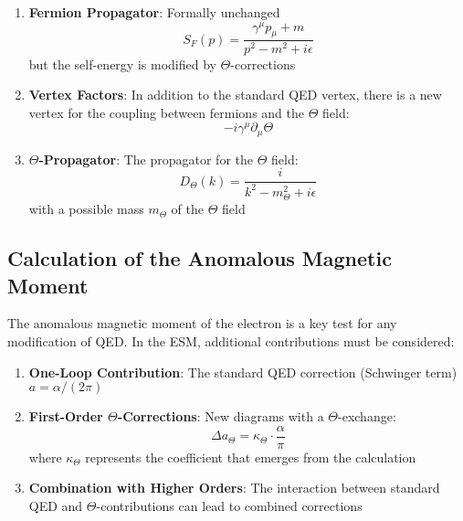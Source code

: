 \documentclass[12pt,a4paper]{article}
\begin{document}
	\begin{enumerate}
		\item \textbf{Fermion Propagator}: Formally unchanged
		\begin{equation}
			S_F(p) = \frac{\gamma^{\mu}p_{\mu} + m}{p^2 - m^2 + i\epsilon}
			\label{eq:fermion_propagator}
		\end{equation}
		but the self-energy is modified by $\Theta$-corrections
		
		\item \textbf{Vertex Factors}: In addition to the standard QED vertex, there is a new vertex for the coupling between fermions and the $\Theta$ field:
		\begin{equation}
			-i\gamma^{\mu}\partial_{\mu}\Theta
			\label{eq:theta_vertex}
		\end{equation}
		
		\item \textbf{$\Theta$-Propagator}: The propagator for the $\Theta$ field:
		\begin{equation}
			D_{\Theta}(k) = \frac{i}{k^2 - m_{\Theta}^2 + i\epsilon}
			\label{eq:theta_propagator}
		\end{equation}
		with a possible mass $m_{\Theta}$ of the $\Theta$ field
	\end{enumerate}
	
	\subsection{Calculation of the Anomalous Magnetic Moment}
	\label{subsec:magnetic_moment}
	
	The anomalous magnetic moment of the electron is a key test for any modification of QED. In the ESM, additional contributions must be considered:
	
	\begin{enumerate}
		\item \textbf{One-Loop Contribution}: The standard QED correction (Schwinger term) $a = \alpha/(2\pi)$
		\item \textbf{First-Order $\Theta$-Corrections}: New diagrams with a $\Theta$-exchange:
		\begin{equation}
			\Delta a_{\Theta} = \kappa_{\Theta} \cdot \frac{\alpha}{\pi}
			\label{eq:theta_correction}
		\end{equation}
		where $\kappa_{\Theta}$ represents the coefficient that emerges from the calculation
		\item \textbf{Combination with Higher Orders}: The interaction between standard QED and $\Theta$-contributions can lead to combined corrections
	\end{enumerate}
	
\end{document}
